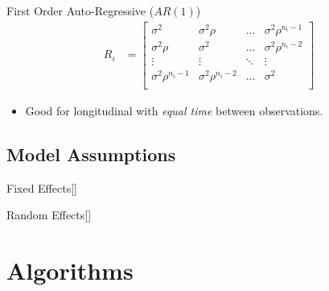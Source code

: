 \documentclass[english]{article}
\begin{document}
\begin{multicols*}{2}
First Order Auto-Regressive ($AR(1)$)
\begin{align*}
	R_{i}
	&=	\begin{bmatrix}
		\sigma^{2}	&	\sigma^{2}\rho	&	\dots	&	\sigma^{2}\rho^{n_{i}-1}	\\
		\sigma^{2}\rho	&	\sigma^{2}	&	\dots	&	\sigma^{2}\rho^{n_{i}-2}	\\
		\vdots	&	\vdots	&	\ddots	&	\vdots	\\
		\sigma^{2}\rho^{n_{i}-1}	&	\sigma^{2}\rho^{n_{i}-2}	&	\dots	&	\sigma^{2}	\\
		\end{bmatrix}
\end{align*}
\begin{itemize}
	\item	Good for longitudinal with \textit{equal time} between observations.
\end{itemize}


\subsection{Model Assumptions}
\begin{definitionGENERAL}{Fixed Effects}[]

\end{definitionGENERAL}

\begin{definitionGENERAL}{Random Effects}[]

\end{definitionGENERAL}



\columnbreak
\section{Algorithms}\label{sec:BAlgorithms}
\begin{definitionNOHFILL}

\end{definitionNOHFILL}


\begin{definitionNOHFILL}

\end{definitionNOHFILL}


\begin{definitionNOHFILL}

\end{definitionNOHFILL}




\end{multicols*}
\end{document}
